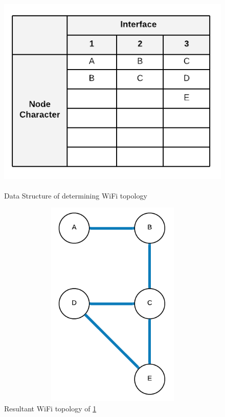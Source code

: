 \begin{figure}
    \begin{centering}
        \includegraphics[width=15cm,height=10cm,keepaspectratio]{Figures/Chapter5-WifiArray.png}
        \caption{Data Structure of determining WiFi topology}
        \label{fig:chapter5WiFiDataStructure}
    \end{centering}
\end{figure}

\begin{figure}
    \begin{centering}
        \includegraphics[width=15cm,height=10cm,keepaspectratio]{Figures/Chapter5-WifiArrayResult.png}
        \caption{Resultant WiFi topology of \figurename{ \ref{fig:chapter5WiFiDataStructure}}}
        \label{fig:chapter5ResultWifiTopology}
    \end{centering}
\end{figure}

